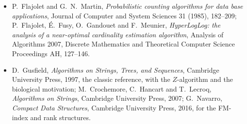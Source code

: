 \begin{itemize}
\item P.~Flajolet and G.~N.~Martin, \emph{Probabilistic counting algorithms for data base applications}, Journal of Computer and System Sciences 31 (1985), 182--209; P.~Flajolet, \'E.~Fusy, O.~Gandouet and F.~Meunier, \emph{HyperLogLog: the analysis of a near-optimal cardinality estimation algorithm}, Analysis of Algorithms 2007, Discrete Mathematics and Theoretical Computer Science Proceedings AH, 127--146.
\item D.~Gusfield, \emph{Algorithms on Strings, Trees, and Sequences}, Cambridge University Press, 1997, the classic reference, with the $Z$-algorithm and the biological motivation; M.~Crochemore, C.~Hancart and T.~Lecroq, \emph{Algorithms on Strings}, Cambridge University Press, 2007; G.~Navarro, \emph{Compact Data Structures}, Cambridge University Press, 2016, for the FM-index and rank structures.
\end{itemize}
